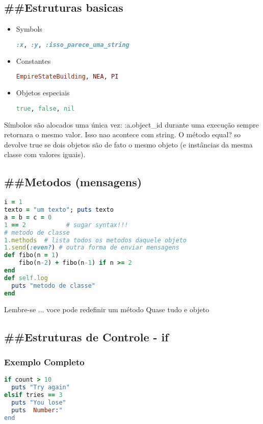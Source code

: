 \documentclass[serif,mathserif]{article}
\begin{document}
\subsection{\#\#Estruturas basicas}
\begin{itemize}
  \item Symbols
\begin{lstlisting}[language=ruby]
:x, :y, :isso_parece_uma_string
\end{lstlisting}

  \item Constantes 
\begin{lstlisting}[language=ruby]  
EmpireStateBuilding, NEA, PI
\end{lstlisting}

  \item Objetos especiais 
\begin{lstlisting}[language=ruby]
true, false, nil
\end{lstlisting}
\end{itemize}

Símbolos são alocados uma única vez: :a.object\_id durante uma execução sempre
retornara o mesmo valor. Isso nao acontece com string. O método equal? so
devolve true se dois objetos são de fato o mesmo objeto (e instâncias da mesma
classe com valores iguais).

\subsection{\#\#Metodos (mensagens)}
\begin{lstlisting}[language=ruby]
i = 1        
texto = "um texto"; puts texto
a = b = c = 0
1 == 2           # sugar syntax!!!
# metodo de classe
1.methods  # lista todos os metodos daquele objeto
1.send(:even?) # outra forma de enviar mensagens
def fibo(n = 1)
    fibo(n-2) + fibo(n-1) if n >= 2
end
def self.log
  puts "metodo de classe"
end
\end{lstlisting}

Lembre-se ... voce pode redefinir um método
Quase tudo e objeto

\subsection{\#\#Estruturas de Controle - if}
 
       
\subsubsection {Exemplo Completo}
\begin{lstlisting}[language=ruby]
if count > 10
  puts "Try again"
elsif tries == 3
  puts "You lose"
  puts  Number:"
end
\end{lstlisting}
\end{document}
